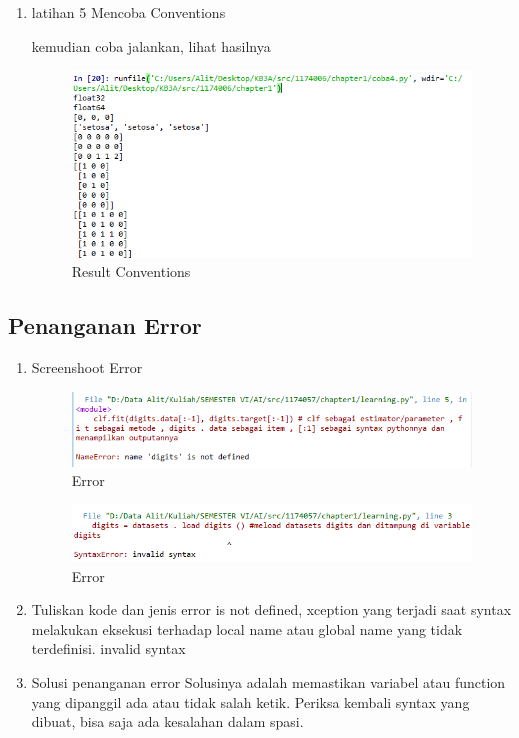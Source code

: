 \begin{enumerate}
		\item latihan 5 Mencoba Conventions
		
		\par kemudian coba jalankan, lihat hasilnya
		\begin{figure}[H]
		\centering
		\includegraphics[width=1\textwidth]{figures/1174057/chapter1/9.png}
		\caption{Result Conventions}
		\label{print}
		\end{figure}

	\end{enumerate}

\subsection{Penanganan Error}
	\begin{enumerate}
		\item Screenshoot Error
		\begin{figure}[H]
		\centering
		\includegraphics[width=1\textwidth]{figures/1174057/chapter1/error1.png}
		\caption{Error}
		\label{print}
		\end{figure}

		\begin{figure}[H]
		\centering
		\includegraphics[width=1\textwidth]{figures/1174057/chapter1/error2.png}
		\caption{Error}
		\label{print}
		\end{figure}

		\item Tuliskan kode dan jenis error
			\subitem is not defined, xception yang terjadi saat syntax melakukan eksekusi terhadap local name atau global name yang tidak terdeﬁnisi.
			\subitem invalid syntax

		\item Solusi penanganan error
			\subitem Solusinya adalah memastikan variabel atau function yang dipanggil ada atau tidak salah ketik. 
			\subitem Periksa kembali syntax yang dibuat, bisa saja ada kesalahan dalam spasi.
	\end{enumerate}

